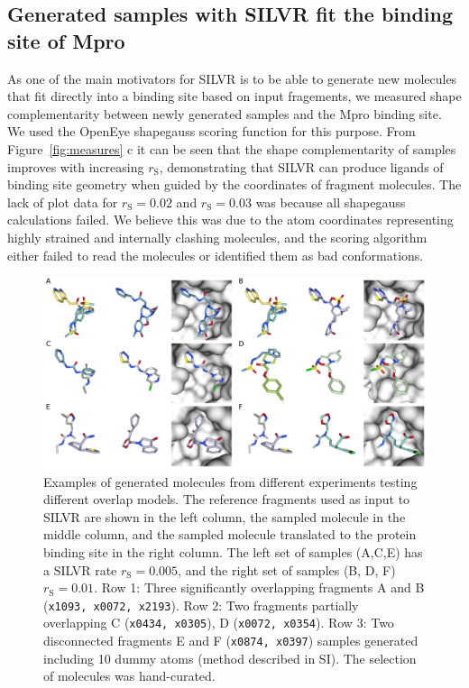 \documentclass[journal=jacsat,manuscript=article]{achemso}
\begin{document}
\subsection{Generated samples with SILVR fit the binding site of Mpro}
As one of the main motivators for SILVR is to be able to generate new molecules that fit directly into a binding site based on input fragements, we measured shape complementarity between newly generated samples and the Mpro binding site. We used the OpenEye shapegauss scoring function for this purpose. From Figure~\ref{fig:measures} c it can be seen that the shape complementarity of samples improves with increasing $r_{\mathrm{S}}$, demonstrating that SILVR can produce ligands of binding site geometry when guided by the coordinates of fragment molecules. The lack of plot data for $r_{\mathrm{S}}=0.02$ and $r_{\mathrm{S}}=0.03$ was because all shapegauss calculations failed. We believe this was due to the atom coordinates representing highly strained and internally clashing molecules, and the scoring algorithm either failed to read the molecules or identified them as bad conformations.

\begin{figure}
    \centering
    \includegraphics[width=\textwidth]{paper/Figures/Fig4/fig_4_ref_sample_bound.png}
    \caption{Examples of generated molecules from different experiments testing different overlap models. The reference fragments used as input to SILVR  are shown in the left column, the sampled molecule in the middle column, and the sampled molecule translated to the protein binding site in the right column. The left set of samples (A,C,E) has a SILVR rate $r_{\mathrm{S}}=0.005$, and the right set of samples (B, D, F) $r_{\mathrm{S}}=0.01$. Row 1: Three significantly overlapping fragments A and B (\texttt{x1093, x0072, x2193}). Row 2: Two fragments partially overlapping C (\texttt{x0434, x0305}), D (\texttt{x0072, x0354}). Row 3: Two disconnected fragments E and F (\texttt{x0874, x0397}) samples generated including 10 dummy atoms (method described in SI). The selection of molecules was hand-curated.}
    \label{fig:samples}
\end{figure}
\end{document}
